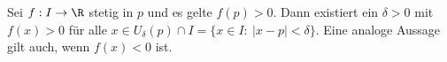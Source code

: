 Sei $f: I \to \R$ stetig in $p$ und es gelte $f(p) > 0$. Dann existiert ein $\delta > 0$ mit $f(x) > 0$ für alle $x \in U_\delta (p) \cap I = \{x \in I : \ |x-p| < \delta\}$. Eine analoge Aussage gilt auch, wenn $f(x) < 0$ ist.